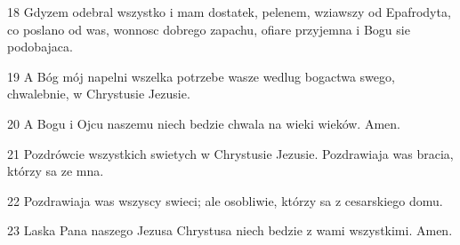 \par 18 Gdyzem odebral wszystko i mam dostatek, pelenem, wziawszy od Epafrodyta, co poslano od was, wonnosc dobrego zapachu, ofiare przyjemna i Bogu sie podobajaca.
\par 19 A Bóg mój napelni wszelka potrzebe wasze wedlug bogactwa swego, chwalebnie, w Chrystusie Jezusie.
\par 20 A Bogu i Ojcu naszemu niech bedzie chwala na wieki wieków. Amen.
\par 21 Pozdrówcie wszystkich swietych w Chrystusie Jezusie. Pozdrawiaja was bracia, którzy sa ze mna.
\par 22 Pozdrawiaja was wszyscy swieci; ale osobliwie, którzy sa z cesarskiego domu.
\par 23 Laska Pana naszego Jezusa Chrystusa niech bedzie z wami wszystkimi. Amen.



